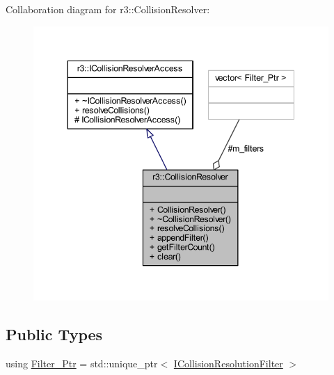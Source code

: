 Collaboration diagram for r3\+:\+:Collision\+Resolver\+:\nopagebreak
\begin{figure}[H]
\begin{center}
\leavevmode
\includegraphics[width=344pt]{classr3_1_1_collision_resolver__coll__graph}
\end{center}
\end{figure}
\subsection*{Public Types}
\begin{DoxyCompactItemize}
\item 
using \mbox{\hyperlink{classr3_1_1_collision_resolver_ad1c9ca40341498c0fe4d483d21c8eb9b}{Filter\+\_\+\+Ptr}} = std\+::unique\+\_\+ptr$<$ \mbox{\hyperlink{classr3_1_1_i_collision_resolution_filter}{I\+Collision\+Resolution\+Filter}} $>$
\end{DoxyCompactItemize}
